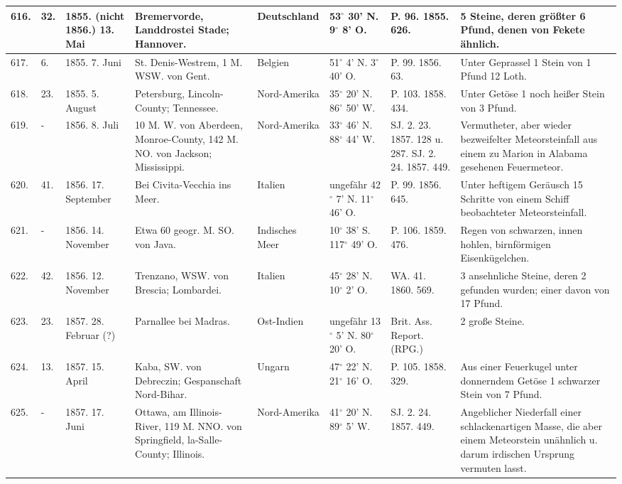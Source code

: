 \documentclass[a4paper, 11pt, oneside, polutonikogreek, german]{article}
\begin{document}
\begin{table}[!ht]
\begin{tabular}{|l|l|l|l|l|l|l|l|}
        616. & 32. & 1855. (nicht 1856.) 13. Mai & Bremervorde, Landdrostei Stade; Hannover. & Deutschland & 53$^\circ$ 30' N. 9$^\circ$ 8' O. & P. 96. 1855. 626. & 5 Steine, deren größter 6 Pfund, denen von Fekete ähnlich. \\ \hline
        617. & 6. & 1855. 7. Juni & St. Denis-Westrem, 1 M. WSW. von Gent. & Belgien & 51$^\circ$ 4' N. 3$^\circ$ 40' O. & P. 99. 1856. 63. & Unter Geprassel 1 Stein von 1 Pfund 12 Loth. \\ \hline
        618. & 23. & 1855. 5. August & Petersburg, Lincoln-County; Tennessee. & Nord-Amerika & 35$^\circ$ 20' N. 86$^\circ$ 50' W. & P. 103. 1858. 434. & Unter Getöse 1 noch heißer Stein von 3 Pfund. \\ \hline
        619. & - & 1856. 8. Juli & 10 M. W. von Aberdeen, Monroe-County, 142 M. NO. von Jackson; Mississippi. & Nord-Amerika & 33$^\circ$ 46' N. 88$^\circ$ 44' W. & SJ. 2. 23. 1857. 128 u. 287. SJ. 2. 24. 1857. 449. & Vermutheter, aber wieder bezweifelter Meteorsteinfall aus einem zu Marion in Alabama gesehenen Feuermeteor. \\ \hline
        620. & 41. & 1856. 17. September & Bei Civita-Vecchia ins Meer. & Italien & ungefähr 42$^\circ$ 7' N. 11$^\circ$ 46' O. & P. 99. 1856. 645. & Unter heftigem Geräusch 15 Schritte von einem Schiff beobachteter Meteorsteinfall. \\ \hline
        621. & - & 1856. 14. November & Etwa 60 geogr. M. SO. von Java. & Indisches Meer & 10$^\circ$ 38' S. 117$^\circ$ 49' O. & P. 106. 1859. 476. & Regen von schwarzen, innen hohlen, birnförmigen Eisenkügelchen. \\ \hline
        622. & 42. & 1856. 12. November & Trenzano, WSW. von Brescia; Lombardei. & Italien & 45$^\circ$ 28' N. 10$^\circ$ 2' O. & WA. 41. 1860. 569. & 3 ansehnliche Steine, deren 2 gefunden wurden; einer davon von 17 Pfund. \\ \hline
        623. & 23. & 1857. 28. Februar (?) & Parnallee bei Madras. & Ost-Indien & ungefähr 13$^\circ$ 5' N. 80$^\circ$ 20' O. & Brit. Ass. Report. (RPG.) & 2 große Steine. \\ \hline
        624. & 13. & 1857. 15. April & Kaba, SW. von Debreczin; Gespanschaft Nord-Bihar. & Ungarn & 47$^\circ$ 22' N. 21$^\circ$ 16' O. & P. 105. 1858. 329. & Aus einer Feuerkugel unter donnerndem Getöse 1 schwarzer Stein von 7 Pfund. \\ \hline
        625. & - & 1857. 17. Juni & Ottawa, am Illinois-River, 119 M. NNO. von Springfield, la-Salle-County; Illinois. & Nord-Amerika & 41$^\circ$ 20' N. 89$^\circ$ 5' W. & SJ. 2. 24. 1857. 449. & Angeblicher Niederfall einer schlackenartigen Masse, die aber einem Meteorstein unähnlich u. darum irdischen Ursprung vermuten lasst. \\ \hline

\end{tabular}
\end{table}
\end{document}
